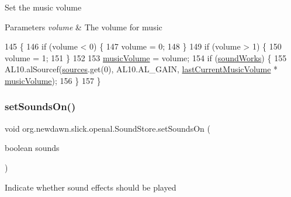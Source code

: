 Set the music volume


\begin{DoxyParams}{Parameters}
{\em volume} & The volume for music \\
\hline
\end{DoxyParams}

\begin{DoxyCode}
145                                              \{
146         \textcolor{keywordflow}{if} (volume < 0) \{
147             volume = 0;
148         \}
149         \textcolor{keywordflow}{if} (volume > 1) \{
150             volume = 1;
151         \}
152         
153         \mbox{\hyperlink{classorg_1_1newdawn_1_1slick_1_1openal_1_1_sound_store_a1394ddfb866b8bc402414b8f861227c0}{musicVolume}} = volume;
154         \textcolor{keywordflow}{if} (\mbox{\hyperlink{classorg_1_1newdawn_1_1slick_1_1openal_1_1_sound_store_ae563e9c1a01e333dc2350f1450f451fd}{soundWorks}}) \{
155             AL10.alSourcef(\mbox{\hyperlink{classorg_1_1newdawn_1_1slick_1_1openal_1_1_sound_store_a3a2ffa73acd847102bb30140129c440b}{sources}}.get(0), AL10.AL\_GAIN, 
      \mbox{\hyperlink{classorg_1_1newdawn_1_1slick_1_1openal_1_1_sound_store_a2e3c5e8604fb9229621276c4d1ea1ffd}{lastCurrentMusicVolume}} * \mbox{\hyperlink{classorg_1_1newdawn_1_1slick_1_1openal_1_1_sound_store_a1394ddfb866b8bc402414b8f861227c0}{musicVolume}}); 
156         \}
157     \}
\end{DoxyCode}
\mbox{\label{classorg_1_1newdawn_1_1slick_1_1openal_1_1_sound_store_a901fb679a53489b4dd042c12586be4e7}} 
\subsubsection{\texorpdfstring{set\+Sounds\+On()}{setSoundsOn()}}
{\footnotesize\ttfamily void org.\+newdawn.\+slick.\+openal.\+Sound\+Store.\+set\+Sounds\+On (\begin{DoxyParamCaption}\item[{boolean}]{sounds }\end{DoxyParamCaption})\hspace{0.3cm}{\ttfamily [inline]}}

Indicate whether sound effects should be played


